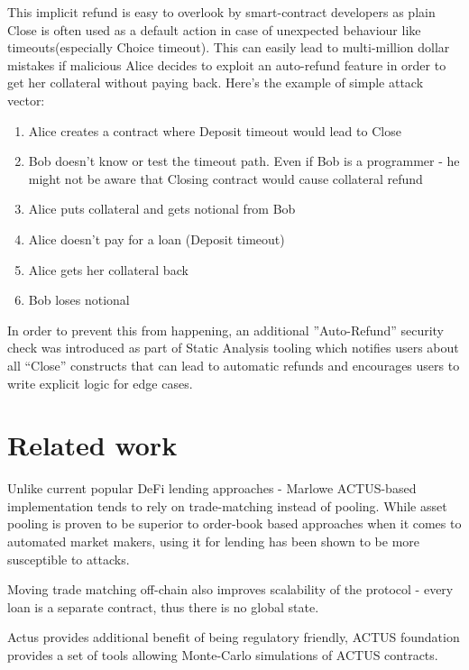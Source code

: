\documentclass[runningheads]{llncs}
\begin{document}
This implicit refund is easy to overlook by smart-contract developers
as plain Close is often used as a default action in case of unexpected
behaviour like timeouts(especially Choice timeout). This can easily
lead to multi-million dollar mistakes if malicious Alice decides to
exploit an auto-refund feature in order to get her collateral without
paying back. Here's the example of simple attack vector: 
\begin{enumerate}
\item Alice creates a contract where Deposit timeout would lead to Close 
\item Bob doesn't know or test the timeout path. Even if Bob is a programmer
- he might not be aware that Closing contract would cause collateral
refund 
\item Alice puts collateral and gets notional from Bob 
\item Alice doesn't pay for a loan (Deposit timeout) 
\item Alice gets her collateral back 
\item Bob loses notional 
\end{enumerate}
In order to prevent this from happening, an additional ''Auto-Refund''
security check was introduced as part of Static Analysis tooling which
notifies users about all ``Close'' constructs that can lead to automatic
refunds and encourages users to write explicit logic for edge cases.

\section{Related work}\label{related}



Unlike current popular DeFi lending approaches - Marlowe ACTUS-based
implementation tends to rely on trade-matching instead of pooling.
While asset pooling is proven to be superior to order-book based approaches
when it comes to automated market makers, using it for lending has
been shown to be more susceptible to attacks\cite{flash-loan}.

Moving trade matching off-chain also improves scalability of the protocol
- every loan is a separate contract, thus there is no global state.

Actus provides additional benefit of being regulatory friendly, ACTUS
foundation provides a set of tools allowing Monte-Carlo simulations
of ACTUS contracts.
\end{document}
